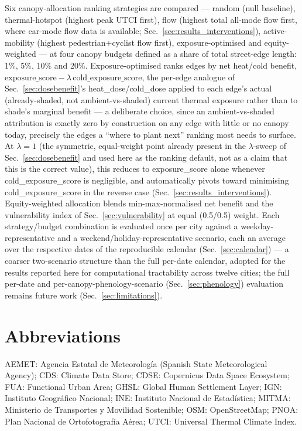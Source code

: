 \documentclass[pdflatex,sn-mathphys-ay]{sn-jnl}
\begin{document}
Six canopy-allocation ranking strategies are compared --- random (null
baseline), thermal-hotspot (highest peak UTCI first), flow (highest total
all-mode flow first, where car-mode flow data is available;
Sec.~\ref{sec:results_interventions}), active-mobility (highest
pedestrian+cyclist flow first), exposure-optimised and equity-weighted --- at
four canopy budgets defined as a share of total street-edge length: 1\%,
5\%, 10\% and 20\%. Exposure-optimised ranks edges by net heat/cold benefit,
$\mathrm{exposure\_score} - \lambda\,\mathrm{cold\_exposure\_score}$, the
per-edge analogue of Sec.~\ref{sec:dosebenefit}'s heat\_dose/cold\_dose
applied to each edge's actual (already-shaded, not ambient-vs-shaded)
current thermal exposure rather than to shade's marginal benefit --- a
deliberate choice, since an ambient-vs-shaded attribution is exactly zero by
construction on any edge with little or no canopy today, precisely the
edges a ``where to plant next'' ranking most needs to surface. At
$\lambda=1$ (the symmetric, equal-weight point already present in the
$\lambda$-sweep of Sec.~\ref{sec:dosebenefit} and used here as the ranking
default, not as a claim that this is the correct value), this reduces to
exposure\_score alone whenever cold\_exposure\_score is negligible, and
automatically pivots toward minimising cold\_exposure\_score in the reverse
case (Sec.~\ref{sec:results_interventions}). Equity-weighted allocation
blends min-max-normalised net benefit and the vulnerability index of
Sec.~\ref{sec:vulnerability} at equal (0.5/0.5) weight. Each strategy/budget
combination is evaluated once per city against a weekday-representative and
a weekend/holiday-representative scenario, each an average over the
respective dates of the reproducible calendar (Sec.~\ref{sec:calendar}) ---
a coarser two-scenario structure than the full per-date calendar, adopted
for the results reported here for computational tractability across twelve
cities; the full per-date and per-canopy-phenology-scenario
(Sec.~\ref{sec:phenology}) evaluation remains future work
(Sec.~\ref{sec:limitations}).

\backmatter

\section*{Abbreviations}
AEMET: Agencia Estatal de Meteorolog\'ia (Spanish State Meteorological
Agency); CDS: Climate Data Store; CDSE: Copernicus Data Space Ecosystem; FUA:
Functional Urban Area; GHSL: Global Human Settlement Layer; IGN: Instituto
Geogr\'afico Nacional; INE: Instituto Nacional de Estad\'istica; MITMA:
Ministerio de Transportes y Movilidad Sostenible; OSM: OpenStreetMap; PNOA:
Plan Nacional de Ortofotograf\'ia A\'erea; UTCI: Universal Thermal Climate
Index.
\end{document}
